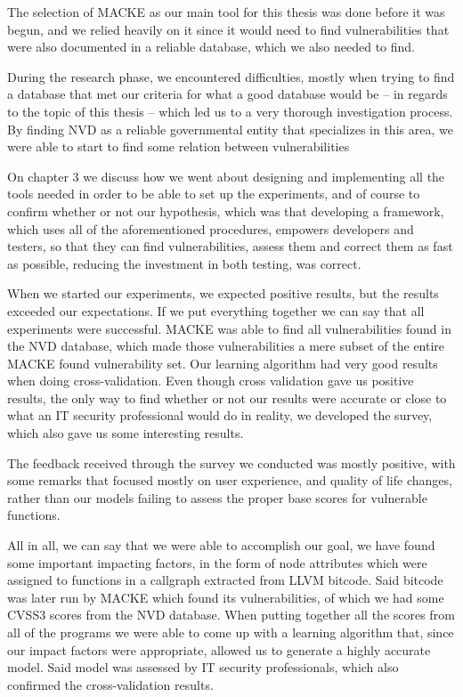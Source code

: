 The selection of MACKE as our main tool for this thesis was done before it was begun, and we relied heavily on it since it would need to find vulnerabilities that were also documented in a reliable database, which we also needed to find.

During the research phase, we encountered difficulties, mostly when trying to find a database that met our criteria for what a good database would be -- in regards to the topic of this thesis -- which led us to a very thorough investigation process. By finding NVD as a reliable governmental entity that specializes in this area, we were able to start to find some relation between vulnerabilities

On chapter 3 we discuss how we went about designing and implementing all the tools needed in order to be able to set up the experiments, and of course to confirm whether or not our hypothesis, which was that developing a framework, which uses all of the aforementioned procedures, empowers developers and testers, so that they can find vulnerabilities, assess them and correct them as fast as possible, reducing the investment in both testing, was correct.

When we started our experiments, we expected positive results, but the results exceeded our expectations. If we put everything together we can say that all experiments were successful. MACKE was able to find all vulnerabilities found in the NVD database, which made those vulnerabilities a mere subset of the entire MACKE found vulnerability set. Our learning algorithm had very good results when doing cross-validation. Even though cross validation gave us positive results, the only way to find whether or not our results were accurate or close to what an IT security professional would do in reality, we developed the survey, which also gave us some interesting results.

The feedback received through the survey we conducted was mostly positive, with some remarks that focused mostly on user experience, and quality of life changes, rather than our models failing to assess the proper base scores for vulnerable functions.

All in all, we can say that we were able to accomplish our goal, we have found some important impacting factors, in the form of node attributes which were assigned to functions in a callgraph extracted from LLVM bitcode. Said bitcode was later run by MACKE which found its vulnerabilities, of which we had some CVSS3 scores from the NVD database. When putting together all the scores from all of the programs we were able to come up with a learning algorithm that, since our impact factors were appropriate, allowed us to generate a highly accurate model. Said model was assessed by IT security professionals, which also confirmed the cross-validation results.


